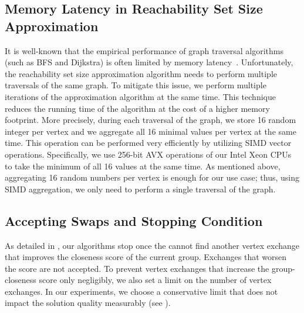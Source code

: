 \subsection{Memory Latency in Reachability Set Size Approximation}
%
It is well-known that the empirical performance of graph traversal algorithms
(such as BFS and Dijkstra) is often limited by memory
latency~\cite{DBLP:conf/icpp/BaderCF05,DBLP:journals/ppl/LumsdaineGHB07}.
Unfortunately, the reachability set size approximation algorithm needs to perform
multiple traversals of the same graph. To mitigate this issue, we perform multiple
iterations of the approximation algorithm at the same time.
%
This technique reduces the running time of the algorithm at the cost of a higher
memory footprint. More precisely, during each traversal of the graph, we store 16
random integer per vertex and we aggregate all 16 minimal values per vertex at the
same time. This operation can be performed very efficiently by utilizing SIMD vector
operations. Specifically, we use 256-bit AVX operations of our Intel Xeon CPUs to
take the minimum of all 16 values at the same time. As mentioned above,
aggregating 16 random numbers per vertex is enough for our use case; thus, using SIMD
aggregation, we only need to perform a single traversal of the graph.

\subsection{Accepting Swaps and Stopping Condition}
%
As detailed in , our
algorithms stop once the cannot find another vertex exchange that improves the
closeness score of the current group. Exchanges that worsen the score are not
accepted. To prevent vertex exchanges that increase the group-closeness score
only negligibly, we also set a limit on the number of vertex exchanges. In our
experiments, we choose a conservative limit that does not impact the solution
quality measurably (see ).

